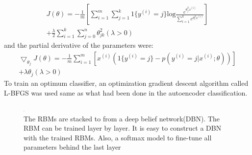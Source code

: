 \documentclass{bmcart}
\begin{document}
\begin{equation}
\begin{split}
J(\theta) = -\frac{1}{m}[\sum_{i=1}^m\sum_{j=1}^k1\{y^{(i)}=j\}\text{log}{\frac{e^{\theta_j^Tx^{(i)}}}{\sum_{l=1}^ke^{\theta_l^Tx^{(i)}}}}] \\
+ \frac{\lambda}{2} \sum_{i=1}^k \sum_{j=0}^n \theta_{jk}^2 (\lambda>0)
\end{split}
\end{equation}
and the partial derivative of the parameters were:
\begin{equation}
\begin{split}
\bigtriangledown_{\theta_j}J(\theta) = -\frac{1}{m}\sum_{i=1}^m[x^{(i)}(1\{y^{(i)}=j\}-p(y^{(i)}=j|x^{(i)};\theta))] \\
+ \lambda\theta_j  (\lambda>0)
\end{split}
\end{equation}
To train an optimum classifier, an optimization gradient descent algorithm called L-BFGS was used same as what had been done in the autoencoder classification.

\begin{figure}[]
\centering
\includegraphics[width=2]{dbn.eps}
\caption{The RBMs are stacked to from a deep belief network(DBN). The RBM can be trained layer by layer. It is easy to construct a DBN with the trained RBMs. Also, a softmax model to fine-tune all parameters behind the last layer}
\label{figure2}
\end{figure} 
\end{document}
